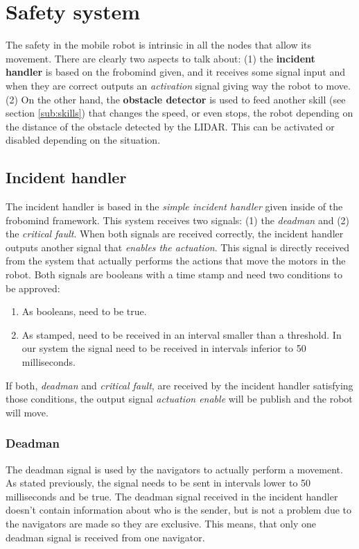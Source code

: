 \section{Safety system} %
\label{sec:mr_safety_system}
The safety in the mobile robot is intrinsic in all the nodes that allow its movement.
There are clearly two aspects to talk about: (1) the \textbf{incident handler} is based on the frobomind given, and it receives some signal input and when they are correct outputs an \emph{activation} signal giving way the robot to move.
(2) On the other hand, the \textbf{obstacle detector} is used to feed another skill (see section \ref{sub:skills}) that changes the speed, or even stops, the robot depending on the distance of the obstacle detected by the LIDAR.
This can be activated or disabled depending on the situation.
	\subsection{Incident handler} %
	\label{sub:mr_incident_handler}
	The incident handler is based in the \emph{simple incident handler} given inside of the frobomind framework.
	This system receives two signals: (1) the \emph{deadman} and (2) the \emph{critical fault}.
	When both signals are received correctly, the incident handler outputs another signal that \emph{enables the actuation}.
	This signal is directly received from the system that actually performs the actions that move the motors in the robot.
	Both signals are booleans with a time stamp and need two conditions to be approved:
	\begin{enumerate}
		\item As booleans, need to be true.
		\item As stamped, need to be received in an interval smaller than a threshold. In our system the signal need to be received in intervals inferior to 50 milliseconds.
	\end{enumerate}
	If both, \emph{deadman} and \emph{critical fault}, are received by the incident handler satisfying those conditions, the output signal \emph{actuation enable} will be publish and the robot will move.
		\subsubsection{Deadman} %
		\label{ssub:mr_deadman}
		The deadman signal is used by the navigators to actually perform a movement.
		As stated previously, the signal needs to be sent in intervals lower to 50 milliseconds and be true.
		The deadman signal received in the incident handler doesn't contain information about who is the sender, but is not a problem due to the navigators are made so they are exclusive.
		This means, that only one deadman signal is received from one navigator.

